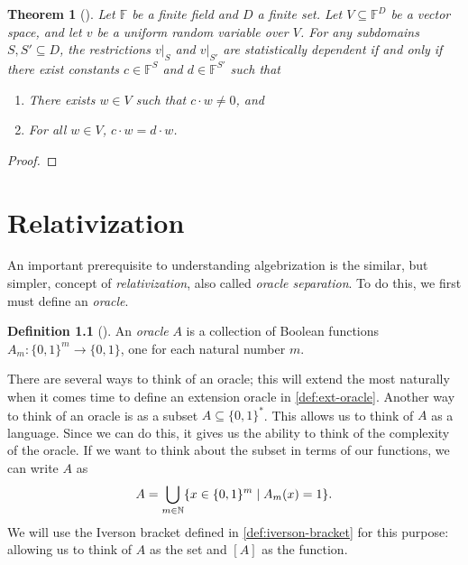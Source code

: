 \documentclass[english,12pt]{reedthesis}
\theoremstyle{plain}
\newtheorem{thm}{Theorem}[section]
\theoremstyle{definition}
\newtheorem{defn}[defn]{Definition}
\theoremstyle{remark}
\begin{document}
\begin{thm}[{\cite[Claim 2]{CFGS22}}]\label{thm:lin-indep-stat-indep}
  Let $\mathbb{F}$ be a finite field and $D$ a finite set. Let
  $V \subseteq \mathbb{F}^{D}$ be a vector space, and let $v$ be a uniform random
  variable over $V$. For any subdomains $S, S' \subseteq D$, the restrictions $v|_{S}$
  and $v|_{S'}$ are statistically dependent if and only if there exist constants
  $c \in \mathbb{F}^{S}$ and $d \in \mathbb{F}^{S'}$ such that
  \begin{enumerate}
    \item There exists $w \in V$ such that $c \cdot w \ne 0$, and
    \item For all $w \in V$, $c \cdot w = d \cdot w$.
  \end{enumerate}
\end{thm}

\begin{proof}
\end{proof}

\chapter{Relativization}


An important prerequisite to understanding algebrization is the similar, but
simpler, concept of \emph{relativization}, also called \emph{oracle separation}.
To do this, we first must define an \emph{oracle}.
\begin{defn}[{\cite[Def.\ 2.1]{AW09}}]\label{def:oracle}
  An \emph{oracle} $A$ is a collection of Boolean functions
  $A_{m}\colon \{0, 1\}^{m} \rightarrow \{0, 1\}$, one for each natural number $m$.
\end{defn}
There are several ways to think of an oracle; this will extend the most
naturally when it comes time to define an extension oracle in
\cref{def:ext-oracle}. Another way to think of an oracle is as a subset
$A \subseteq \{0, 1\}^{*}$. This allows us to think of $A$ as a language. Since we can
do this, it gives us the ability to think of the complexity of the oracle. If we
want to think about the subset in terms of our functions, we can write $A$ as
\begin{equation}
  A = \bigcup_{m \in \mathbb{N}}\mleft\{x \in \{0, 1\}^{m} \mid A_{m}(x) = 1\mright\}.
\end{equation}
We will use the Iverson bracket defined in \cref{def:iverson-bracket} for this
purpose: allowing us to think of $A$ as the set and $[A]$ as the function.
\end{document}
